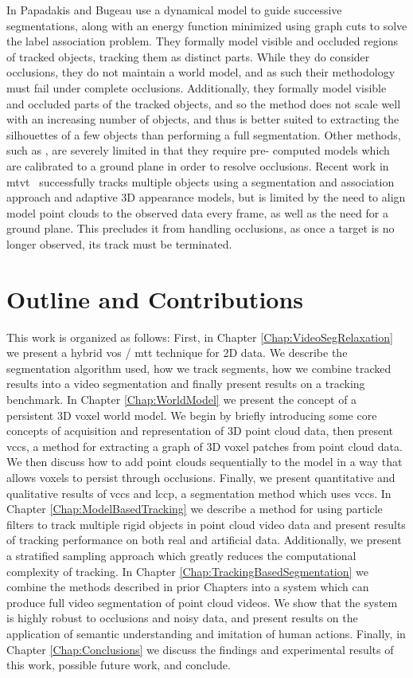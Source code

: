 In \cite{TrackingOcclusionsGraphCuts} Papadakis and Bugeau use a dynamical model to guide successive segmentations, along with an energy function minimized using graph cuts to solve the label association problem. They formally model visible and occluded regions of tracked objects, tracking them as distinct parts. While they do consider occlusions, they do not maintain a world model, and as such their methodology must fail under complete occlusions.  Additionally, they formally model visible and occluded parts of the tracked objects, and so the method does not scale well with an increasing number of objects, and thus is better suited to extracting the silhouettes of a few objects than performing a full segmentation. Other methods, such as \cite{LayeredGraphicalModels}, are severely limited in that they require pre-
computed models which are calibrated to a ground plane in order to resolve occlusions. Recent work in \gls{mtvt}~\cite{MultiObjectTracking} successfully tracks multiple objects using a segmentation and association approach and adaptive 3D appearance models, but is limited by the need to align model point clouds to the observed data every frame, as well as the need for a ground plane. This precludes it from handling occlusions, as once a target is no longer observed, its track must be terminated.

\section{Outline and Contributions}
This work is organized as follows: First, in Chapter \ref{Chap:VideoSegRelaxation} we present a hybrid \gls{vos} / \gls{mtt} technique for 2D data. We describe the segmentation algorithm used, how we track segments, how we combine tracked results into a video segmentation and finally present results on a tracking benchmark. In Chapter \ref{Chap:WorldModel} we present the concept of a persistent 3D voxel world model. We begin by briefly introducing some core concepts of acquisition and representation of 3D point cloud data, then present \gls{vccs}, a method for extracting a graph of 3D voxel patches from point cloud data. We then discuss how to add point clouds sequentially to the model in a way that allows voxels to persist through occlusions. Finally, we present quantitative and qualitative results of \gls{vccs} and \gls{lccp}, a segmentation method which uses \gls{vccs}. In Chapter \ref{Chap:ModelBasedTracking} we describe a method for using particle filters to track multiple rigid objects in point cloud video data and present results of tracking performance on both real and artificial data. Additionally, we present a stratified sampling approach which greatly reduces the computational complexity of tracking. In Chapter \ref{Chap:TrackingBasedSegmentation} we combine the methods described in prior Chapters into a system which can produce full video segmentation of point cloud videos. We show that the system is highly robust to occlusions and noisy data, and present results on the application of semantic understanding and imitation of human actions. Finally, in Chapter \ref{Chap:Conclusions} we discuss the findings and experimental results of this work, possible future work, and conclude.

